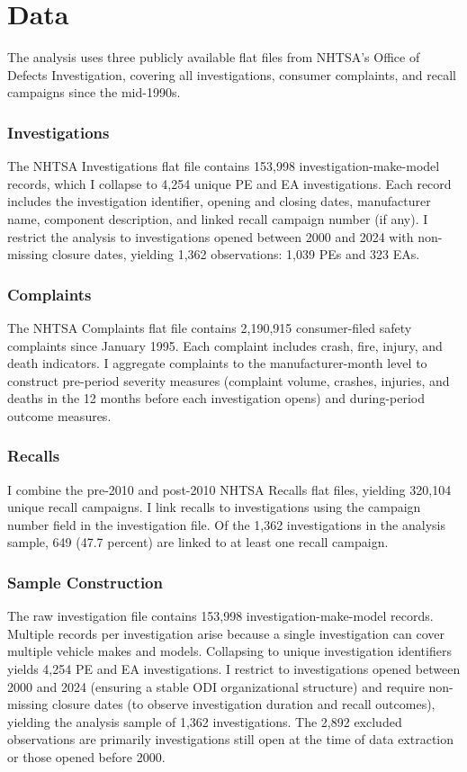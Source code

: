 \documentclass[12pt]{article}
\begin{document}
\section{Data}

The analysis uses three publicly available flat files from NHTSA's Office of Defects Investigation, covering all investigations, consumer complaints, and recall campaigns since the mid-1990s.

\subsubsection*{Investigations} The NHTSA Investigations flat file contains 153,998 investigation-make-model records, which I collapse to 4,254 unique PE and EA investigations. Each record includes the investigation identifier, opening and closing dates, manufacturer name, component description, and linked recall campaign number (if any). I restrict the analysis to investigations opened between 2000 and 2024 with non-missing closure dates, yielding 1,362 observations: 1,039 PEs and 323 EAs.

\subsubsection*{Complaints} The NHTSA Complaints flat file contains 2,190,915 consumer-filed safety complaints since January 1995. Each complaint includes crash, fire, injury, and death indicators. I aggregate complaints to the manufacturer-month level to construct pre-period severity measures (complaint volume, crashes, injuries, and deaths in the 12 months before each investigation opens) and during-period outcome measures.

\subsubsection*{Recalls} I combine the pre-2010 and post-2010 NHTSA Recalls flat files, yielding 320,104 unique recall campaigns. I link recalls to investigations using the campaign number field in the investigation file. Of the 1,362 investigations in the analysis sample, 649 (47.7 percent) are linked to at least one recall campaign.

\subsubsection*{Sample Construction} The raw investigation file contains 153,998 investigation-make-model records. Multiple records per investigation arise because a single investigation can cover multiple vehicle makes and models. Collapsing to unique investigation identifiers yields 4,254 PE and EA investigations. I restrict to investigations opened between 2000 and 2024 (ensuring a stable ODI organizational structure) and require non-missing closure dates (to observe investigation duration and recall outcomes), yielding the analysis sample of 1,362 investigations. The 2,892 excluded observations are primarily investigations still open at the time of data extraction or those opened before 2000.
\end{document}
